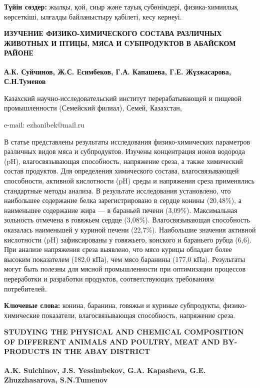 {\bfseries Түйін сөздер:} жылқы, қой, сиыр және тауық субөнімдері,
физика-химиялық көрсеткіші, ылғалды байланыстыру қабілеті, кесу кернеуі.

\begin{articleheader}
{\bfseries ИЗУЧЕНИЕ ФИЗИКО-ХИМИЧЕСКОГО СОСТАВА РАЗЛИЧНЫХ ЖИВОТНЫХ И ПТИЦЫ,
МЯСА И СУБПРОДУКТОВ В АБАЙСКОМ РАЙОНЕ}

{\bfseries
А.К. Суйчинов,
Ж.С. Есимбеков\textsuperscript{\envelope },
Г.А. Капашева,
Г.Е. Жүзжасарова,
С.Н.Туменов
}
\end{articleheader}

\begin{affiliation}
Казахский научно-исследовательский институт перерабатывающей и пищевой промышленности (Семейский филиал), Семей, Казахстан,

e-mail: ezhanibek@mail.ru
\end{affiliation}

В статье представлены результаты исследования физико-химических
параметров различных видов мяса и субпродуктов. Изучены концентрация
ионов водорода (pH), влагосвязывающая способность, напряжение среза, а
также химический состав продуктов. Для определения химического состава,
влагосвязывающей способности, активной кислотности (pH) среды и
напряжения среза применялись стандартные методы анализа. В результате
исследования установлено, что наибольшее содержание белка
зарегистрировано в сердце конины (20,48\%), а наименьшее содержание жира
--- в бараньей печени (3,09\%). Максимальная зольность отмечена в
говяжьем сердце (3,08\%). Влагосвязывающая способность оказалась
наименьшей у куриной печени (22,7\%). Наибольшие значения активной
кислотности (pH) зафиксированы у говяжьего, конского и бараньего рубца
(6,6). При анализе напряжения среза выявлено, что мясо курицы обладает
более высоким показателем (182,0 кПа), чем мясо баранины (177,0 кПа).
Результаты могут быть полезны для мясной промышленности при оптимизации
процессов переработки и разработки продуктов, соответствующих
требованиям потребителей.

{\bfseries Ключевые слова:} конина, баранина, говяжьи и куриные
субпродукты, физико-химические показатели, влагосвязывающая способность,
напряжение среза.

\begin{articleheader}
{\bfseries STUDYING THE PHYSICAL AND CHEMICAL COMPOSITION OF DIFFERENT
ANIMALS AND POULTRY, MEAT AND BY-PRODUCTS IN THE ABAY DISTRICT}

{\bfseries
A.K. Suichinov,
J.S. Yessimbekov\textsuperscript{\envelope },
G.A. Kapasheva,
G.E. Zhuzzhasarova,
S.N.Tumenov
}
\end{articleheader}

